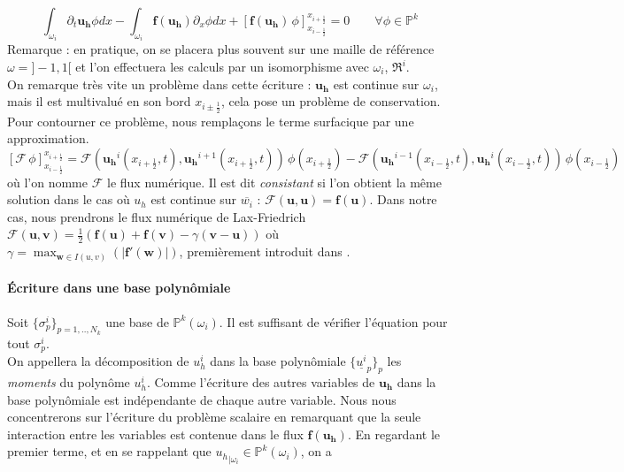 \begin{equation}\label{Formulation_Variationnelle}
    \int_{\omega_i} \partial_t \mathbf{u_h} \phi dx - \int_{\omega_i} \mathbf{f}(\mathbf{u_h}) \partial_x \phi dx + \left[ \mathbf{f}(\mathbf{u_h})\,\phi \right]_{x_{i-\frac{1}{2}}}^{x_{i+\frac{1}{2}}} = 0 \qquad \forall \phi \in \mathbb{P}^k
\end{equation}
\noindent
Remarque : en pratique, on se placera plus souvent sur une maille de référence $\omega=]-1,1[$ et l'on effectuera les calculs par un isomorphisme avec $\omega_i$,  $\mathfrak{R}^i$. \\
On remarque très vite un problème dans cette écriture : $\mathbf{u_h}$ est continue sur $\omega_i$, mais il est multivalué en son bord $ {x_{i\pm\frac{1}{2}}}$, cela pose un problème de conservation. 
Pour contourner ce problème, nous remplaçons le terme surfacique par une approximation.
\begin{equation}
\left[ \mathcal{F}\, \phi \right]_{x_{i-\frac{1}{2}}}^{x_{i+\frac{1}{2}}}
=  \mathcal{F}(\mathbf{u_h}^i(x_{i+\frac{1}{2}},t), \mathbf{u_h}^{i+1}(x_{i+\frac{1}{2}},t)) \, \phi(x_{i+\frac{1}{2}}) - \mathcal{F}(\mathbf{u_h}^{i-1}(x_{i-\frac{1}{2}},t), \mathbf{u_h}^i(x_{i-\frac{1}{2}},t)) \, \phi(x_{i-\frac{1}{2}})
\end{equation}
où l'on nomme $\mathcal{F}$ le flux numérique. Il est dit \textit{consistant} si l'on obtient la même solution dans le cas où $u_h$ est continue sur $\overline{w_i}$ : $\mathcal{F}(\mathbf{u},\mathbf{u}) =  \mathbf{f}(\mathbf{u})$.
Dans notre cas, nous prendrons le flux numérique de Lax-Friedrich  $ \mathcal{F}(\mathbf{u},\mathbf{v}) = \frac{1}{2}(\mathbf{f}(\mathbf{u}) + \mathbf{f}(\mathbf{v}) - \gamma(\mathbf{v}-\mathbf{u}) )  $
où $\gamma = \max_{\mathbf{w} \in I(u,v)} (|\mathbf{f'(\mathbf{w})}| )$, premièrement introduit dans \cite{LaxFriedrichFlux}.

\paragraph{Écriture dans une base polynômiale \\}
Soit $\{\sigma_p^i\}_{p=1,..,N_k}$ une base de $\mathbb{P}^k(\omega_i)$. Il est suffisant de vérifier l'équation pour tout $\sigma_p^i$.\\
On appellera la décomposition de $u_h^i$ dans la base polynômiale $\{\underline{u^i}_p\}_p$ les \emph{moments} du polynôme $u_h^i$.
Comme l'écriture des autres variables de $\mathbf{u_h}$ dans la base polynômiale est indépendante de chaque autre variable. 
Nous nous concentrerons sur l'écriture du problème scalaire en remarquant que la seule interaction entre les variables est contenue dans le flux $\mathbf{f(u_h)}$.   
En regardant le premier terme, et en se rappelant que ${u_{h}}_{|\omega_i} \in \mathbb{P}^k(\omega_i)$, on a 

